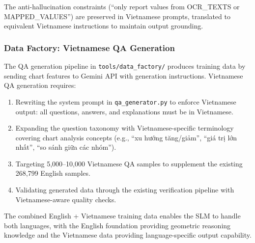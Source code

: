 The anti-hallucination constraints (``only report values from OCR\_TEXTS or
MAPPED\_VALUES'') are preserved in Vietnamese prompts, translated to equivalent
Vietnamese instructions to maintain output grounding.

\subsubsection{Data Factory: Vietnamese QA Generation}

The QA generation pipeline in \texttt{tools/data\_factory/} produces training data by
sending chart features to Gemini API with generation instructions. Vietnamese QA
generation requires:

\begin{enumerate}
    \item Rewriting the system prompt in \texttt{qa\_generator.py} to enforce Vietnamese
          output: all questions, answers, and explanations must be in Vietnamese.
    \item Expanding the question taxonomy with Vietnamese-specific terminology covering
          chart analysis concepts (e.g.,
          ``xu hướng tăng/giảm'',
          ``giá trị lớn nhất'',
          ``so sánh giữa các nhóm'').
    \item Targeting 5,000--10,000 Vietnamese QA samples to supplement the existing
          268,799 English samples.
    \item Validating generated data through the existing verification pipeline with
          Vietnamese-aware quality checks.
\end{enumerate}

The combined English + Vietnamese training data enables the SLM to handle both languages,
with the English foundation providing geometric reasoning knowledge and the Vietnamese
data providing language-specific output capability.